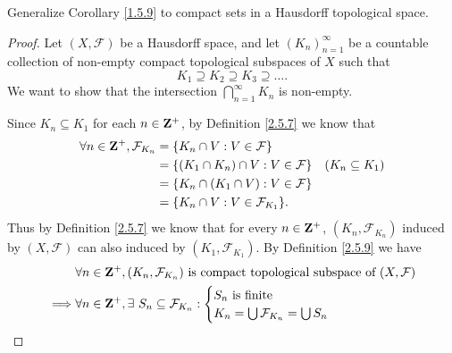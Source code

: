 \begin{exercise}\label{ex 2.5.13}
    Generalize Corollary \ref{1.5.9} to compact sets in a Hausdorff topological space.
\end{exercise}

\begin{proof}
    Let \((X, \mathcal{F})\) be a Hausdorff space, and let \((K_n)_{n = 1}^\infty\) be a countable collection of non-empty compact topological subspaces of \(X\) such that
    \[
        K_1 \supseteq K_2 \supseteq K_3 \supseteq \dots.
    \]
    We want to show that the intersection \(\bigcap_{n = 1}^\infty K_n\) is non-empty.

    Since \(K_n \subseteq K_1\) for each \(n \in \mathbf{Z}^+\), by Definition \ref{2.5.7} we know that
    \begin{align*}
        \forall n \in \mathbf{Z}^+, \mathcal{F}_{K_n} & = \{K_n \cap V : V \in \mathcal{F}\}                                  \\
                                              & = \{(K_1 \cap K_n) \cap V : V \in \mathcal{F}\} & (K_n \subseteq K_1) \\
                                              & = \{K_n \cap (K_1 \cap V) : V \in \mathcal{F}\}                       \\
                                              & = \{K_n \cap V : V \in \mathcal{F}_{K_1}\}.
    \end{align*}
    Thus by Definition \ref{2.5.7} we know that for every \(n \in \mathbf{Z}^+\), \((K_n, \mathcal{F}_{K_n})\) induced by \((X, \mathcal{F})\) can also induced by \((K_1, \mathcal{F}_{K_1})\).
    By Definition \ref{2.5.9} we have
    \begin{align*}
                 & \forall n \in \Z^+, (K_n, \mathcal{F}_{K_n}) \text{ is compact topological subspace of } (X, \mathcal{F})                                                                \\
        \implies & \forall n \in \Z^+, \exists\ S_n \subseteq \mathcal{F}_{K_n} : \begin{cases}
                                                                                      S_n \text{ is finite} \\
                                                                                      K_n = \bigcup \mathcal{F}_{K_n} = \bigcup S_n
                                                                                  \end{cases}                                                              \\

\end{align*}
\end{proof}
